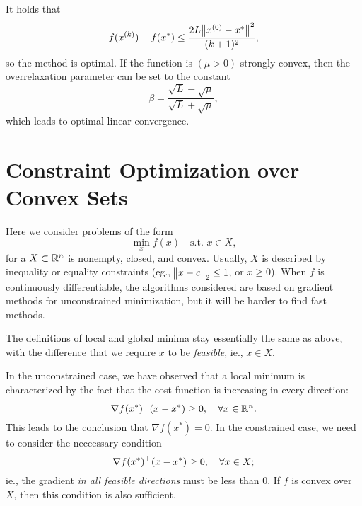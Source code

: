 \documentclass{article}
\begin{document}
It holds that
\begin{equation*}
  f(\kth{x}) - f(x^*) \leq \frac{2L\enVert[1]{\kth[0]{x} - x^*}^2}{(k + 1)^2},
\end{equation*}
so the method is optimal.  If the function is \((\mu > 0)\)-strongly convex, then the overrelaxation
parameter can be set to the constant
\begin{equation*}
  \beta = \frac{\sqrt{L} - \sqrt{\mu}}{\sqrt{L} + \sqrt{\mu}},
\end{equation*}
which leads to optimal linear convergence.



\section{Constraint Optimization over Convex Sets}


Here we consider problems of the form
\begin{equation*}
  \min_{x} f(x) \quad \text{s.t. } x \in X,
\end{equation*}
for a \(X \subset \mathbb{R}^n\) is nonempty, closed, and convex.  Usually, \(X\) is described by
inequality or equality constraints (eg., \(\enVert[1]{x - c}_2 \leq 1\), or \(x \geq 0\)).  When
\(f\) is continuously differentiable, the algorithms considered are based on gradient methods for
unconstrained minimization, but it will be harder to find fast methods.

The definitions of local and global minima stay essentially the same as above, with the difference
that we require \(x\) to be \emph{feasible}, ie., \(x \in X\).



In the unconstrained case, we have observed that a local minimum is characterized by the fact that
the cost function is increasing in every direction:
\begin{equation*}
  \nabla f(x^*)^{\top}(x - x^*) \geq 0, \quad\forall x \in \mathbb{R}^n.
\end{equation*}
This leads to the conclusion that \(\nabla f(x^*) = 0\). In the constrained case, we need to
consider the neccessary condition
\begin{equation*}
  \nabla f(x^*)^{\top}(x - x^*) \geq 0, \quad\forall x \in X;
\end{equation*}
ie., the gradient \emph{in all feasible directions} must be less than \(0\).  If \(f\) is convex
over \(X\), then this condition is also sufficient.
\end{document}
